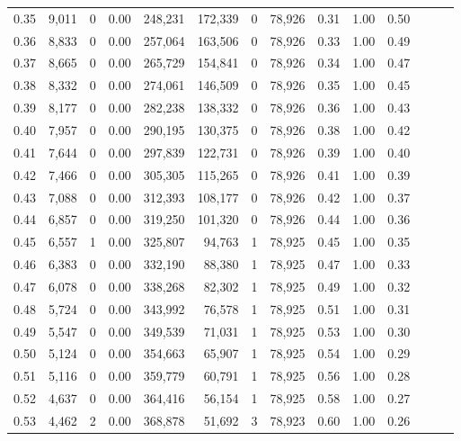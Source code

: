 \begin{tabular}{rrrrrrrrrrrrrr}
0.35 &  9,011 &      0 &  0.00 &  248,231 &  172,339 &       0 &  78,926 &  0.31 &  1.00 &      0.50 \\
0.36 &  8,833 &      0 &  0.00 &  257,064 &  163,506 &       0 &  78,926 &  0.33 &  1.00 &      0.49 \\
0.37 &  8,665 &      0 &  0.00 &  265,729 &  154,841 &       0 &  78,926 &  0.34 &  1.00 &      0.47 \\
0.38 &  8,332 &      0 &  0.00 &  274,061 &  146,509 &       0 &  78,926 &  0.35 &  1.00 &      0.45 \\
0.39 &  8,177 &      0 &  0.00 &  282,238 &  138,332 &       0 &  78,926 &  0.36 &  1.00 &      0.43 \\
0.40 &  7,957 &      0 &  0.00 &  290,195 &  130,375 &       0 &  78,926 &  0.38 &  1.00 &      0.42 \\
0.41 &  7,644 &      0 &  0.00 &  297,839 &  122,731 &       0 &  78,926 &  0.39 &  1.00 &      0.40 \\
0.42 &  7,466 &      0 &  0.00 &  305,305 &  115,265 &       0 &  78,926 &  0.41 &  1.00 &      0.39 \\
0.43 &  7,088 &      0 &  0.00 &  312,393 &  108,177 &       0 &  78,926 &  0.42 &  1.00 &      0.37 \\
0.44 &  6,857 &      0 &  0.00 &  319,250 &  101,320 &       0 &  78,926 &  0.44 &  1.00 &      0.36 \\
0.45 &  6,557 &      1 &  0.00 &  325,807 &   94,763 &       1 &  78,925 &  0.45 &  1.00 &      0.35 \\
0.46 &  6,383 &      0 &  0.00 &  332,190 &   88,380 &       1 &  78,925 &  0.47 &  1.00 &      0.33 \\
0.47 &  6,078 &      0 &  0.00 &  338,268 &   82,302 &       1 &  78,925 &  0.49 &  1.00 &      0.32 \\
0.48 &  5,724 &      0 &  0.00 &  343,992 &   76,578 &       1 &  78,925 &  0.51 &  1.00 &      0.31 \\
0.49 &  5,547 &      0 &  0.00 &  349,539 &   71,031 &       1 &  78,925 &  0.53 &  1.00 &      0.30 \\
0.50 &  5,124 &      0 &  0.00 &  354,663 &   65,907 &       1 &  78,925 &  0.54 &  1.00 &      0.29 \\
0.51 &  5,116 &      0 &  0.00 &  359,779 &   60,791 &       1 &  78,925 &  0.56 &  1.00 &      0.28 \\
0.52 &  4,637 &      0 &  0.00 &  364,416 &   56,154 &       1 &  78,925 &  0.58 &  1.00 &      0.27 \\
0.53 &  4,462 &      2 &  0.00 &  368,878 &   51,692 &       3 &  78,923 &  0.60 &  1.00 &      0.26 \\

\end{tabular}
